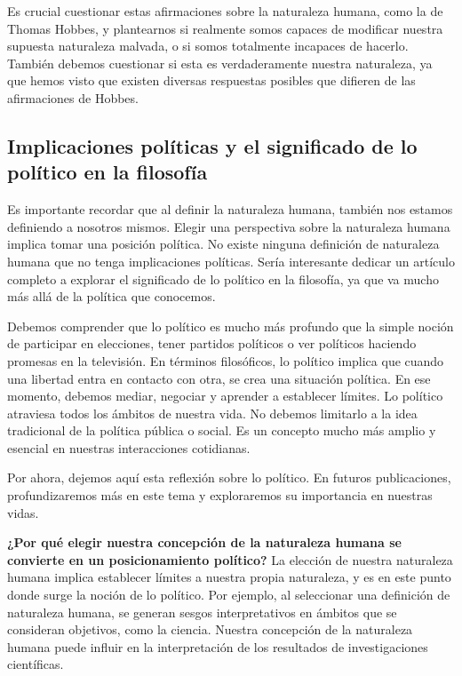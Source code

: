\documentclass[
  jou,
  floatsintext,
  longtable,
  a4paper,
  nolmodern,
  notxfonts,
  notimes,
  12pt,
  colorlinks=true,linkcolor=blue,citecolor=blue,urlcolor=blue]{apa7}
\begin{document}
Es crucial cuestionar estas afirmaciones sobre la naturaleza humana,
como la de Thomas Hobbes, y plantearnos si realmente somos capaces de
modificar nuestra supuesta naturaleza malvada, o si somos totalmente
incapaces de hacerlo. También debemos cuestionar si esta es
verdaderamente nuestra naturaleza, ya que hemos visto que existen
diversas respuestas posibles que difieren de las afirmaciones de Hobbes.

\subsection{Implicaciones políticas y el significado de lo político en
la
filosofía}\label{implicaciones-poluxedticas-y-el-significado-de-lo-poluxedtico-en-la-filosofuxeda}

Es importante recordar que al definir la naturaleza humana, también nos
estamos definiendo a nosotros mismos. Elegir una perspectiva sobre la
naturaleza humana implica tomar una posición política. No existe ninguna
definición de naturaleza humana que no tenga implicaciones políticas.
Sería interesante dedicar un artículo completo a explorar el significado
de lo político en la filosofía, ya que va mucho más allá de la política
que conocemos.

Debemos comprender que lo político es mucho más profundo que la simple
noción de participar en elecciones, tener partidos políticos o ver
políticos haciendo promesas en la televisión. En términos filosóficos,
lo político implica que cuando una libertad entra en contacto con otra,
se crea una situación política. En ese momento, debemos mediar, negociar
y aprender a establecer límites. Lo político atraviesa todos los ámbitos
de nuestra vida. No debemos limitarlo a la idea tradicional de la
política pública o social. Es un concepto mucho más amplio y esencial en
nuestras interacciones cotidianas.

Por ahora, dejemos aquí esta reflexión sobre lo político. En futuros
publicaciones, profundizaremos más en este tema y exploraremos su
importancia en nuestras vidas.

\textbf{¿Por qué elegir nuestra concepción de la naturaleza humana se
convierte en un posicionamiento político?} La elección de nuestra
naturaleza humana implica establecer límites a nuestra propia
naturaleza, y es en este punto donde surge la noción de lo político. Por
ejemplo, al seleccionar una definición de naturaleza humana, se generan
sesgos interpretativos en ámbitos que se consideran objetivos, como la
ciencia. Nuestra concepción de la naturaleza humana puede influir en la
interpretación de los resultados de investigaciones científicas.
\end{document}
